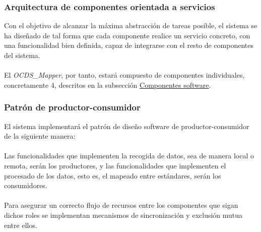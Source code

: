         \subsubsection{Arquitectura de componentes orientada a servicios}
            Con el objetivo de alcanzar la máxima abstracción de tareas posible, el sistema se ha diseñado de tal forma que cada componente realice un servicio concreto, con una funcionalidad bien definida, capaz de integrarse con el resto de componentes del sistema.
            \\ \\
            El \textit{OCDS\_Mapper}, por tanto, estará compuesto de componentes individuales, concretamente 4, descritos en la subsección \hyperref[subsubsec:componentes]{Componentes software}.
            
        \subsubsection{Patrón de productor-consumidor}
            El sistema implementará el patrón de diseño software de productor-consumidor de la siguiente manera:
            \\ \\
            Las funcionalidades que implementen la recogida de datos, sea de manera local o remota, serán los productores, y las funcionalidades que implementen el procesado de los datos, esto es, el mapeado entre estándares, serán los consumidores.
            \\ \\
            Para asegurar un correcto flujo de recursos entre los componentes que sigan dichos roles se implementan mecanismos de sincronización y exclusión mutua entre ellos.
        
